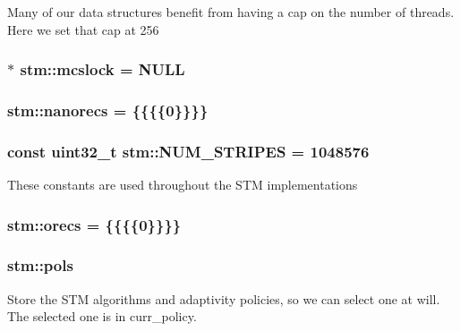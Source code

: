 Many of our data structures benefit from having a cap on the number of threads. Here we set that cap at 256 \hypertarget{namespacestm_a61e4fdd8145b69c03eab91bdeddb0293}{
\subsubsection[{mcslock}]{ $\ast$ stm\-::mcslock = N\-U\-L\-L}}\label{namespacestm_a61e4fdd8145b69c03eab91bdeddb0293}
\hypertarget{namespacestm_a677ac5f80d97329f2058a0aca0bfb295}{
\subsubsection[{nanorecs}]{ stm\-::nanorecs = \{\{\{\{0\}\}\}\}}}\label{namespacestm_a677ac5f80d97329f2058a0aca0bfb295}
\hypertarget{namespacestm_ac333fa1ea03145d9c5d601624ab507eb}{
\subsubsection[{N\-U\-M\-\_\-\-S\-T\-R\-I\-P\-E\-S}]{\setlength{\rightskip}{0pt plus 5cm}const uint32\-\_\-t stm\-::\-N\-U\-M\-\_\-\-S\-T\-R\-I\-P\-E\-S = 1048576\hspace{0.3cm}{\ttfamily [static]}}}\label{namespacestm_ac333fa1ea03145d9c5d601624ab507eb}
These constants are used throughout the S\-T\-M implementations \hypertarget{namespacestm_a59c4d1983c5d8a6640537726c4e8aed4}{
\subsubsection[{orecs}]{ stm\-::orecs = \{\{\{\{0\}\}\}\}}}\label{namespacestm_a59c4d1983c5d8a6640537726c4e8aed4}
\hypertarget{namespacestm_a533577214af07c44f099eb536d8dece7}{
\subsubsection[{pols}]{ stm\-::pols}}\label{namespacestm_a533577214af07c44f099eb536d8dece7}
Store the S\-T\-M algorithms and adaptivity policies, so we can select one at will. The selected one is in curr\-\_\-policy.

